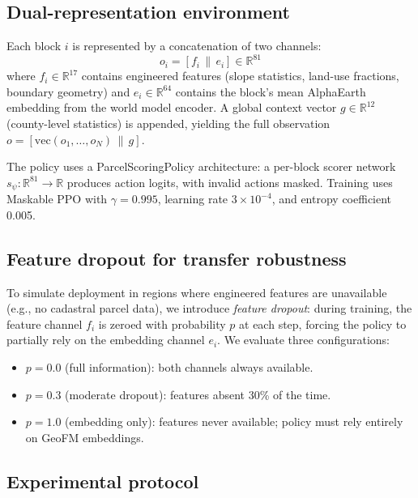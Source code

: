 \documentclass{article}
\begin{document}
\subsection{Dual-representation environment}

Each block $i$ is represented by a concatenation of two channels:
\begin{equation}
o_i = [f_i \,\|\, e_i] \in \mathbb{R}^{81}
\end{equation}
where $f_i \in \mathbb{R}^{17}$ contains engineered features (slope statistics, land-use fractions, boundary geometry) and $e_i \in \mathbb{R}^{64}$ contains the block's mean AlphaEarth embedding from the world model encoder. A global context vector $g \in \mathbb{R}^{12}$ (county-level statistics) is appended, yielding the full observation $o = [\text{vec}(o_1, \ldots, o_N) \,\|\, g]$.

The policy uses a ParcelScoringPolicy architecture: a per-block scorer network $s_\psi: \mathbb{R}^{81} \to \mathbb{R}$ produces action logits, with invalid actions masked. Training uses Maskable PPO \citep{huang2022maskableppo} with $\gamma = 0.995$, learning rate $3 \times 10^{-4}$, and entropy coefficient 0.005.

\subsection{Feature dropout for transfer robustness}

To simulate deployment in regions where engineered features are unavailable (e.g., no cadastral parcel data), we introduce \textit{feature dropout}: during training, the feature channel $f_i$ is zeroed with probability $p$ at each step, forcing the policy to partially rely on the embedding channel $e_i$. We evaluate three configurations:
\begin{itemize}
\item $p = 0.0$ (full information): both channels always available.
\item $p = 0.3$ (moderate dropout): features absent 30\% of the time.
\item $p = 1.0$ (embedding only): features never available; policy must rely entirely on GeoFM embeddings.
\end{itemize}

\subsection{Experimental protocol}
\end{document}
